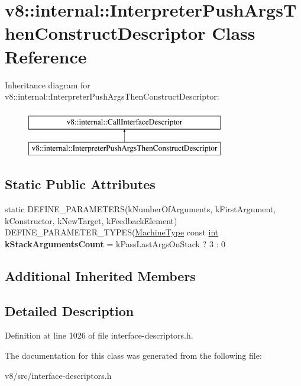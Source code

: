 \hypertarget{classv8_1_1internal_1_1InterpreterPushArgsThenConstructDescriptor}{}\section{v8\+:\+:internal\+:\+:Interpreter\+Push\+Args\+Then\+Construct\+Descriptor Class Reference}
\label{classv8_1_1internal_1_1InterpreterPushArgsThenConstructDescriptor}
Inheritance diagram for v8\+:\+:internal\+:\+:Interpreter\+Push\+Args\+Then\+Construct\+Descriptor\+:\begin{figure}[H]
\begin{center}
\leavevmode
\includegraphics[height=2.000000cm]{classv8_1_1internal_1_1InterpreterPushArgsThenConstructDescriptor}
\end{center}
\end{figure}
\subsection*{Static Public Attributes}
\begin{DoxyCompactItemize}
\item 
\mbox{\label{classv8_1_1internal_1_1InterpreterPushArgsThenConstructDescriptor_a469295b58db79e061b29b2726c58b962}} 
static D\+E\+F\+I\+N\+E\+\_\+\+P\+A\+R\+A\+M\+E\+T\+E\+RS(k\+Number\+Of\+Arguments, k\+First\+Argument, k\+Constructor, k\+New\+Target, k\+Feedback\+Element) D\+E\+F\+I\+N\+E\+\_\+\+P\+A\+R\+A\+M\+E\+T\+E\+R\+\_\+\+T\+Y\+P\+ES(\mbox{\hyperlink{classv8_1_1internal_1_1MachineType}{Machine\+Type}} const \mbox{\hyperlink{classint}{int}} {\bfseries k\+Stack\+Arguments\+Count} = k\+Pass\+Last\+Args\+On\+Stack ? 3 \+: 0
\end{DoxyCompactItemize}
\subsection*{Additional Inherited Members}


\subsection{Detailed Description}


Definition at line 1026 of file interface-\/descriptors.\+h.



The documentation for this class was generated from the following file\+:\begin{DoxyCompactItemize}
\item 
v8/src/interface-\/descriptors.\+h\end{DoxyCompactItemize}
